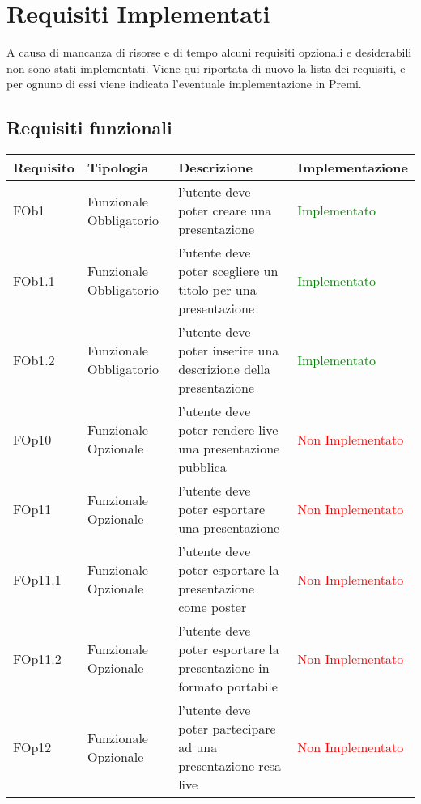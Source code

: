 
\section{Requisiti Implementati}
A causa di mancanza di risorse e di tempo alcuni requisiti opzionali e desiderabili non sono stati implementati. Viene qui riportata di nuovo la lista dei requisiti, e per ognuno di essi viene indicata l'eventuale implementazione in Premi.
\subsection{ Requisiti funzionali}
	
\begin{longtable}{|l|p{2.5cm}|p{5cm}|p{3.5cm}|}
\hline
\textbf{Requisito} & \textbf{Tipologia} & \textbf{Descrizione} & \textbf{Implementazione} \\
\hline
FOb1 & Funzionale \linebreak Obbligatorio & l'utente deve poter creare una presentazione & \textcolor{green}{Implementato} \\
\hline
FOb1.1 & Funzionale \linebreak Obbligatorio & l'utente deve poter scegliere un titolo per una presentazione & \textcolor{green}{Implementato}  \\
\hline
FOb1.2 & Funzionale \linebreak Obbligatorio & l'utente deve poter inserire una descrizione della presentazione & \textcolor{green}{Implementato} \\
\hline
FOp10 & Funzionale \linebreak Opzionale & l'utente deve poter rendere live una presentazione pubblica & \textcolor{red}{Non Implementato} \\
\hline
FOp11 & Funzionale \linebreak Opzionale & l'utente deve poter esportare una presentazione & \textcolor{red}{Non Implementato} \\
\hline
FOp11.1 & Funzionale \linebreak Opzionale & l'utente deve poter esportare la presentazione come poster & \textcolor{red}{Non Implementato}  \\
\hline
FOp11.2 & Funzionale \linebreak Opzionale & l'utente deve poter esportare la presentazione in formato portabile & \textcolor{red}{Non Implementato}  \\
\hline
FOp12 & Funzionale \linebreak Opzionale & l'utente deve poter partecipare ad una presentazione resa live & \textcolor{red}{Non Implementato} \\

\end{longtable}
